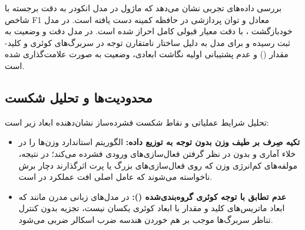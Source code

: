 بررسی داده‌های تجربی نشان می‌دهد که ماژول  در مدل انکودر  به دقت برجسته  با شاخص F1 معادل  و توان پردازشی  در حافظه کمینه  دست یافته است. در مدل خودبازگشت ، با دقت  معیار قبولی کامل  احراز شده است. در مدل  دقت  و وضعیت  به ثبت رسیده و برای مدل  به دلیل ساختار نامتقارن توجه در سربرگ‌های کوئری و کلید-مقدار () و عدم پشتیبانی اولیه نگاشت ابعادی، وضعیت به صورت  علامت‌گذاری شده است.

\subsection{محدودیت‌ها و تحلیل شکست}
تحلیل شرایط عملیاتی و نقاط شکست فشرده‌ساز  نشان‌دهنده ابعاد زیر است:
\begin{itemize}
    \item \textbf{تکیه صِرف بر طیف وزن بدون توجه به توزیع داده:} الگوریتم  استاندارد وزن‌ها را در خلاء آماری و بدون در نظر گرفتن فعال‌سازی‌های ورودی فشرده می‌کند؛ در نتیجه، مولفه‌های کم‌انرژی وزن که روی فعال‌سازی‌های بزرگ یا پرت اثرگذارند دچار برش ناخواسته می‌شوند که عامل اصلی افت عملکرد در  است.
    \item \textbf{عدم تطابق با توجه کوئری گروه‌بندی‌شده ():} در مدل‌های زبانی مدرن مانند  که ابعاد ماتریس‌های کلید و مقدار با ابعاد کوئری یکسان نیست، تجزیه بدون کنترل تناظر سربرگ‌ها موجب بر هم خوردن هندسه ضرب اسکالر ضربی می‌شود.
\end{itemize}
